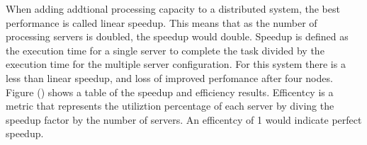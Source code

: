 \documentclass{article}
\newenvironment{Figure}
               {\par\medskip\noindent\minipage{\linewidth}}
               {\endminipage\par\medskip}
\begin{document}
\begin{multicols}{2}
\begin{Figure}
  \centering
  \noindent{}
\end{Figure}

When adding addtional processing capacity to a distributed system, the best performance is called linear speedup.  This means that as the number of processing servers is doubled, the speedup would double. Speedup is defined as the execution time for a single server to complete the task divided by the execution time for the multiple server configuration.  For this system there is a less than linear speedup, and loss of improved perfomance after four nodes.  Figure () shows a table of the speedup and efficiency results.  Efficentcy is a metric that represents the utiliztion percentage of each server by diving the speedup factor by the number of servers.  An efficentcy of 1 would indicate perfect speedup.


\end{multicols}
\end{document}
